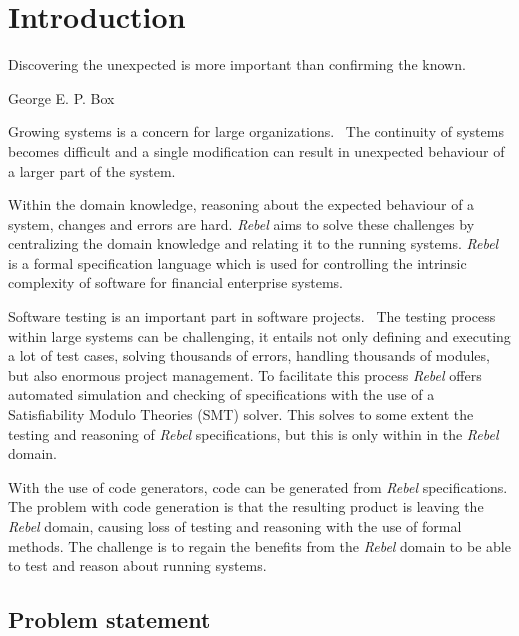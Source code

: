 \chapter{Introduction}

\epigraph{Discovering the unexpected is more important than confirming the
known.}{George E. P. Box}

Growing systems is a concern for large
organizations.~\cite[p.~1]{stoel_storm_vinju_bosman_2016} The continuity of
systems becomes difficult and a single modification can result in unexpected
behaviour of a larger part of the system.

Within the domain knowledge, reasoning about the expected behaviour of a system,
changes and errors are hard. \textit{Rebel} aims to solve these challenges by centralizing the domain knowledge and relating
it to the running systems. \textit{Rebel} is a formal specification language which is
used for controlling the intrinsic complexity of software for financial
enterprise systems.~\cite[p.~1]{stoel_storm_vinju_bosman_2016}

Software testing is an important part in software projects.~\cite[p.~4]{myers2011art} The testing
process within large systems can be challenging, it entails not only defining
and executing a lot of test cases, solving thousands of errors, handling
thousands of modules, but also enormous project management. To facilitate this
process \textit{Rebel} offers automated simulation and checking of specifications with
the use of a Satisfiability Modulo Theories (SMT) solver. This solves to some
extent the testing and reasoning of \textit{Rebel} specifications, but this is only
within in the \textit{Rebel} domain.

With the use of code generators, code can be
generated from \textit{Rebel} specifications. The problem with code generation is that the resulting
product is leaving the \textit{Rebel} domain, causing loss of testing and reasoning with
the use of formal methods. The challenge is to regain the benefits from the
\textit{Rebel} domain to be able to test and reason about running systems.

\section{Problem statement}\label{sec:problem-statement}


